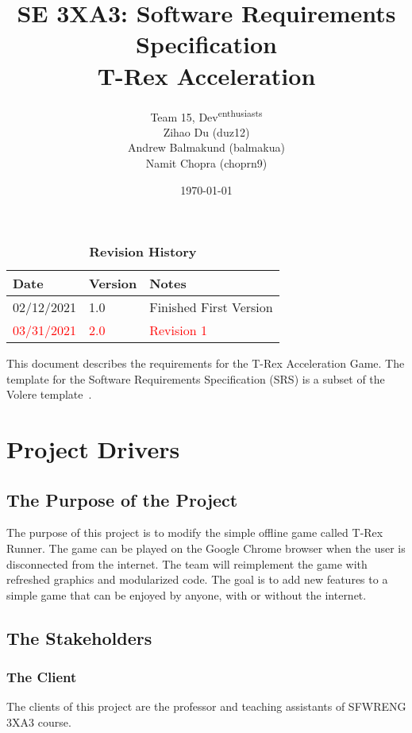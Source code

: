 \documentclass[12pt, titlepage]{article}
\title{SE 3XA3: Software Requirements Specification\\T-Rex Acceleration}
\author{Team 15, Dev\textsuperscript{enthusiasts}
		\\ Zihao Du (duz12)
		\\ Andrew Balmakund (balmakua) 
		\\ Namit Chopra (choprn9)
}
\date{\today}
\begin{document}
\maketitle

\tableofcontents
\listoftables
\listoffigures

\begin{table}[bp]
\caption{\bf Revision History}
\begin{tabularx}{\textwidth}{p{3cm}p{2cm}X}
\toprule {\bf Date} & {\bf Version} & {\bf Notes}\\
\midrule
02/12/2021 & 1.0 & Finished First Version\\
\textcolor{red}{03/31/2021} & \textcolor{red}{2.0} & \textcolor{red}{Revision 1}\\
\bottomrule
\end{tabularx}
\end{table}

\newpage


This document describes the requirements for the T-Rex Acceleration Game. The template for the Software
Requirements Specification (SRS) is a subset of the Volere template~\citep{RobertsonAndRobertson2012}. 

\section{Project Drivers}

\subsection{The Purpose of the Project}
The purpose of this project is to modify the simple offline game called T-Rex Runner. The game can be played on the Google Chrome browser when the user is disconnected from the internet. The team will reimplement the game with refreshed graphics and modularized code. The goal is to add new features to a simple game that can be enjoyed by anyone, with or without the internet. 

\subsection{The Stakeholders}

\subsubsection{The Client}
The clients of this project are the professor and teaching assistants of SFWRENG 3XA3 course.
\end{document}
